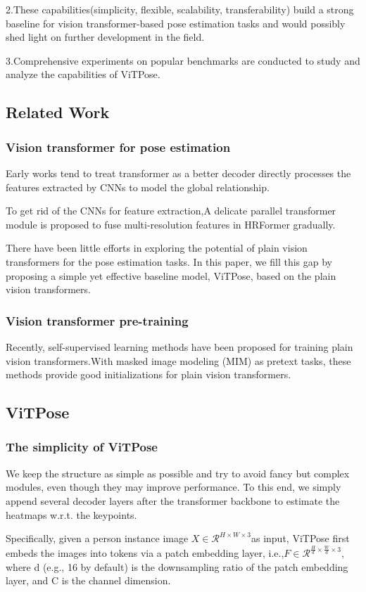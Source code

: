\documentclass[11pt]{article}
\begin{document}
2.These capabilities(simplicity, flexible, scalability, transferability) build a strong baseline for vision transformer-based pose estimation tasks and would possibly shed light on further development in the field.

3.Comprehensive experiments on popular benchmarks are conducted to study and analyze the capabilities of ViTPose.
\subsection{Related Work}
\subsubsection{Vision transformer for pose estimation}
Early works tend to treat transformer as a better decoder directly processes the features extracted by CNNs to model the global relationship.

To get rid of the CNNs for feature extraction,A delicate parallel transformer module is proposed to fuse multi-resolution features in HRFormer gradually.

There have been little efforts in exploring the potential of plain vision transformers for the pose estimation tasks. In this paper, we fill this gap by proposing a simple yet effective baseline model, ViTPose, based on the plain vision transformers.

\subsubsection{Vision transformer pre-training}
Recently, self-supervised learning methods have been proposed for training plain vision transformers.With masked image modeling (MIM) as pretext tasks, these methods provide good initializations for plain vision transformers.
\subsection{ViTPose}
\subsubsection{The simplicity of ViTPose}
We keep the structure as simple as possible and try to avoid fancy but complex modules, even though they may improve performance. To this end, we simply append several decoder layers after the transformer backbone to estimate the heatmaps w.r.t. the keypoints.

Specifically, given a person instance image $X\in \mathcal{R}^{H\times W\times3}$as input, ViTPose first embeds the images into tokens via a patch embedding layer, i.e.,$F\in \mathcal{R}^{\frac{H}{d}\times \frac{W}{d}\times3}$, where d (e.g., 16 by default) is the downsampling ratio of the patch embedding layer, and C is the channel dimension.
\end{document}
